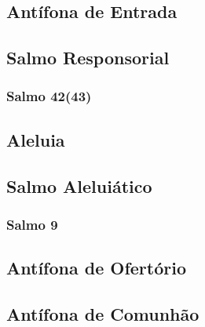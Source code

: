 \subsection{Antífona de Entrada}\label{subsection:tempus-per-annum/missa-2/introitus}

\AllowPageFlush

\subsection[Salmo Responsorial]{Salmo Responsorial}\label{subsection:tempus-per-annum/missa-2/psalmus-responsorius}
\subsubsection{Salmo 42(43)}

\AllowPageFlush

\subsection{Aleluia}\label{subsection:tempus-per-annum/missa-2/alleluia}

\AllowPageFlush

\subsection[Salmo Aleluiático]{Salmo Aleluiático}\label{subsection:tempus-per-annum/missa-2/psalmus-alleluiaticus}
\subsubsection{Salmo 9}

\AllowPageFlush

\subsection{Antífona de Ofertório}\label{subsection:tempus-per-annum/missa-2/offertorium}

\AllowPageFlush

\subsection{Antífona de Comunhão}\label{subsection:tempus-per-annum/missa-2/communio}

\AllowPageBreak